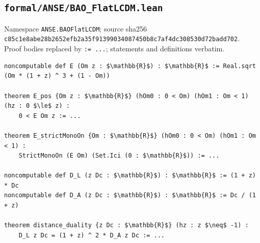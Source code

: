 \subsection*{\texttt{formal/ANSE/BAO\_FlatLCDM.lean}}
Namespace \texttt{ANSE.BAOFlatLCDM}; source sha256\\ {\scriptsize\texttt{c85c1e8abe28b2652efb2a35f91399034087450b8c7af4dc308530d72badd702}}.\\ Proof bodies replaced by \texttt{:= ...}; statements and definitions verbatim.
\begin{lstlisting}[mathescape]
noncomputable def E (Om z : $\mathbb{R}$) : $\mathbb{R}$ := Real.sqrt (Om * (1 + z) ^ 3 + (1 - Om))

theorem E_pos {Om z : $\mathbb{R}$} (hOm0 : 0 < Om) (hOm1 : Om < 1) (hz : 0 $\le$ z) :
    0 < E Om z := ...

theorem E_strictMonoOn {Om : $\mathbb{R}$} (hOm0 : 0 < Om) (hOm1 : Om < 1) :
    StrictMonoOn (E Om) (Set.Ici (0 : $\mathbb{R}$)) := ...

noncomputable def D_L (z Dc : $\mathbb{R}$) : $\mathbb{R}$ := (1 + z) * Dc
noncomputable def D_A (z Dc : $\mathbb{R}$) : $\mathbb{R}$ := Dc / (1 + z)

theorem distance_duality {z Dc : $\mathbb{R}$} (hz : z $\neq$ -1) :
    D_L z Dc = (1 + z) ^ 2 * D_A z Dc := ...
\end{lstlisting}

